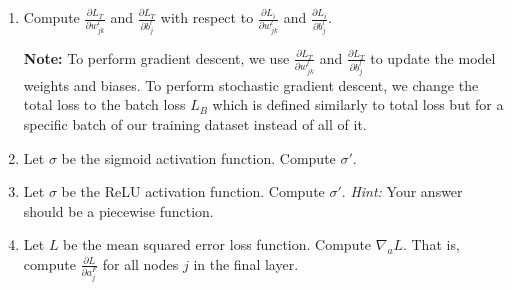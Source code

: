 \documentclass[12pt]{amsart}
\theoremstyle{definition}
\begin{document}
\begin{enumerate}[itemsep=2.5em,leftmargin=0pt]

\item Compute $\displaystyle \frac{\partial L_T}{\partial w^l_{jk}}$ and $\displaystyle \frac{\partial L_T}{\partial b^l_{j}}$ with respect to $\displaystyle \frac{\partial L_i}{\partial w^l_{jk}}$ and $\displaystyle \frac{\partial L_i}{\partial b^l_{j}}$.

\vspace{2.5em}

\noindent \textbf{Note:} To perform gradient descent, we use $\displaystyle \frac{\partial L_T}{\partial w^l_{jk}}$ and $\displaystyle \frac{\partial L_T}{\partial b^l_{j}}$ to update the model weights and biases. To perform stochastic gradient descent, we change the total loss to the batch loss $L_B$ which is defined similarly to total loss but for a specific batch of our training dataset instead of all of it.


\item Let $\sigma$ be the sigmoid activation function. Compute $\sigma'$.

\item Let $\sigma$ be the ReLU activation function. Compute $\sigma'$. \textit{Hint:} Your answer should be a piecewise function.

\item Let $L$ be the mean squared error loss function. Compute $\nabla_a L$. That is, compute $\displaystyle \frac{\partial L}{\partial a^F_j}$ for all nodes $j$ in the final layer.

\end{enumerate}
\end{document}
